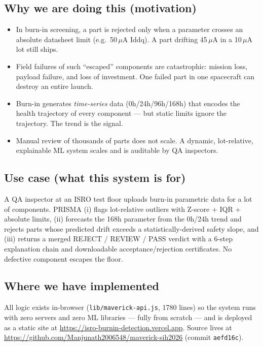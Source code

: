 \documentclass[11pt,a4paper]{article}
\newcommand{\code}[1]{\texttt{\small #1}}
\begin{document}
\subsection*{Why we are doing this (motivation)}
\begin{itemize}[leftmargin=1.5em]
  \item In burn-in screening, a part is rejected only when a parameter crosses an absolute
        datasheet limit (e.g.\ 50\,$\mu$A Iddq). A part drifting 45\,$\mu$A in a 10\,$\mu$A lot
        still ships.
  \item Field failures of such ``escaped'' components are catastrophic: mission loss, payload
        failure, and loss of investment. One failed part in one spacecraft can destroy an entire
        launch.
  \item Burn-in generates \emph{time-series} data (0h/24h/96h/168h) that encodes the health
        trajectory of every component --- but static limits ignore the trajectory. The trend is
        the signal.
  \item Manual review of thousands of parts does not scale. A dynamic, lot-relative, explainable
        ML system scales and is auditable by QA inspectors.
\end{itemize}

\subsection*{Use case (what this system is for)}
A QA inspector at an ISRO test floor uploads burn-in parametric data for a lot of components.
PRISMA (i) flags lot-relative outliers with Z-score + IQR + absolute limits, (ii) forecasts the
168h parameter from the 0h/24h trend and rejects parts whose predicted drift exceeds a
statistically-derived safety slope, and (iii) returns a merged REJECT / REVIEW / PASS verdict
with a 6-step explanation chain and downloadable acceptance/rejection certificates. No defective
component escapes the floor.

\subsection*{Where we have implemented}
All logic exists in-browser (\code{lib/maverick-api.js}, 1780 lines) so the system runs with zero
servers and zero ML libraries --- fully from scratch --- and is deployed as a static site at
\url{https://isro-burnin-detection.vercel.app}. Source lives at
\url{https://github.com/Manjunath2006548/maverick-sih2026} (commit \code{aefd16c}).
\end{document}
